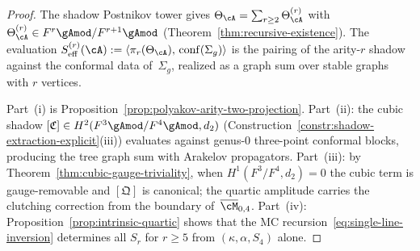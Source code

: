 \begin{proof}
The shadow Postnikov tower gives
$\Theta_\cA = \sum_{r \geq 2} \Theta_\cA^{(r)}$ with
$\Theta_\cA^{(r)} \in F^r \gAmod / F^{r+1} \gAmod$
(Theorem~\ref{thm:recursive-existence}).  The evaluation
$S_{\mathrm{eff}}^{(r)}(\cA) :=
\langle \pi_r(\Theta_\cA),\, \mathrm{conf}(\Sigma_g) \rangle$
is the pairing of the arity-$r$ shadow against the conformal
data of~$\Sigma_g$, realized as a graph sum over stable
graphs with $r$ vertices.

Part~(i) is
Proposition~\ref{prop:polyakov-arity-two-projection}.
Part~(ii): the cubic shadow
$[\mathfrak{C}] \in H^2(F^3\gAmod/F^4\gAmod, d_2)$
(Construction~\ref{constr:shadow-extraction-explicit}(iii))
evaluates against genus-$0$ three-point conformal blocks,
producing the tree graph sum with Arakelov propagators.
Part~(iii): by Theorem~\ref{thm:cubic-gauge-triviality},
when $H^1(F^3/F^4, d_2) = 0$ the cubic term is
gauge-removable and $[\mathfrak{Q}]$ is canonical;
the quartic amplitude carries the clutching correction from
the boundary of~$\overline{\cM}_{0,4}$.
Part~(iv): Proposition~\ref{prop:intrinsic-quartic} shows
that the MC recursion~\eqref{eq:single-line-inversion}
determines all $S_r$ for $r \geq 5$ from
$(\kappa, \alpha, S_4)$ alone.
\end{proof}

